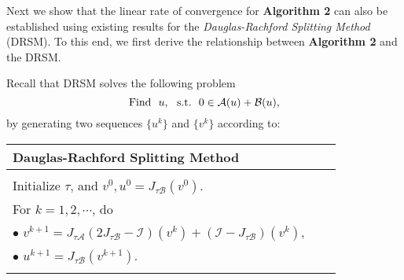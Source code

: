 \documentclass{mcom-l}
\theoremstyle{definition}
\theoremstyle{remark}
\numberwithin{equation}{section}
\begin{document}
Next we show that the linear rate of convergence for {\bf{Algorithm 2}} can also be established using existing results for the {\it Dauglas-Rachford Splitting Method} (DRSM).
To this end, we first derive the relationship between {\bf Algorithm 2} and the DRSM. {Recall that DRSM solves the following problem
\begin{equation}
\hbox{Find}\ \ u,\ \  \hbox{s.t.}\ \ 0\in {\mathcal{A}} (u) + {\mathcal{B}}(u), \label{eqDR}
\end{equation}
by generating two sequences $\{u^k\}$ and $\{v^k\}$  according to:
\begin{center}
\begin{tabular}{@{}llr@{}}\toprule
{\bf{\qquad\quad  Dauglas-Rachford Splitting Method}}\\
\hline\\
\qquad Initialize $\tau$, and $v^0, u^0 = J_{\tau {\mathcal{B}}} (v^0)$.\\
\qquad For $k = 1,2,\cdots $, do\\
\qquad \qquad $\bullet$ $v^{k+1} = J_{\tau {\mathcal{A}}} (2 J_{\tau {\mathcal{B}}} - {\mathcal{I}})(v^k) + ({\mathcal{I}} - J_{\tau {\mathcal{B}}})(v^k)$,\\
\qquad \qquad $\bullet$ $u^{k+1} = J_{\tau {\mathcal{B}}}(v^{k+1})$.\\
\\
\hline
\end{tabular}
\end{center}

}
\end{document}
